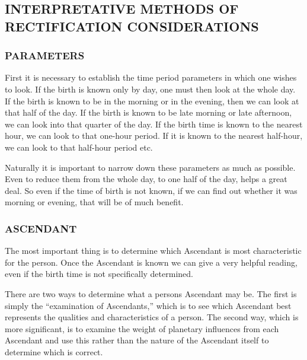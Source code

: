 

\subsection{INTERPRETATIVE METHODS OF RECTIFICATION CONSIDERATIONS}
 

\subsubsection{PARAMETERS}

 

First it is necessary to establish the time period parameters in which one wishes to look. If the birth is known only by day, one must then look at the whole day. If the birth is known to be in the morning or in the evening, then we can look at that half of the day. If the birth is known to be late morning or late afternoon, we can look into that quarter of the day. If the birth time is known to the nearest hour, we can look to that one-hour period. If it is known to the nearest half-hour, we can look to that half-hour period etc.

 

Naturally it is important to narrow down these parameters as much as possible. Even to reduce them from the whole day, to one half of the day, helps a great deal. So even if the time of birth is not known, if we can find out whether it was morning or evening, that will be of much benefit.

 

\subsubsection{ASCENDANT}

 

The most important thing is to determine which Ascendant is most characteristic for the person. Once the Ascendant is known we can give a very helpful reading, even if the birth time is not specifically determined.

 

There are two ways to determine what a persons Ascendant may be. The first is simply the “examination of Ascendants,” which is to see which Ascendant best represents the qualities and characteristics of a person. The second way, which is more significant, is to examine the weight of planetary influences from each Ascendant and use this rather than the nature of the Ascendant itself to determine which is correct.

